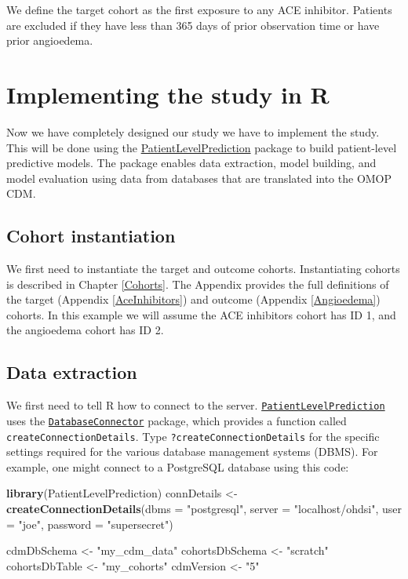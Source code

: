 \documentclass[]{book}
\newenvironment{Shaded}{\begin{snugshade}}{\end{snugshade}}
\newcommand{\KeywordTok}[1]{\textcolor[rgb]{0.13,0.29,0.53}{\textbf{#1}}}
\newcommand{\DataTypeTok}[1]{\textcolor[rgb]{0.13,0.29,0.53}{#1}}
\newcommand{\StringTok}[1]{\textcolor[rgb]{0.31,0.60,0.02}{#1}}
\newcommand{\NormalTok}[1]{#1}
\begin{document}
We define the target cohort as the first exposure to any ACE inhibitor.
Patients are excluded if they have less than 365 days of prior
observation time or have prior angioedema.

\section{Implementing the study in R}\label{implementing-the-study-in-r}

Now we have completely designed our study we have to implement the
study. This will be done using the
\href{https://ohdsi.github.io/PatientLevelPrediction/}{PatientLevelPrediction}
package to build patient-level predictive models. The package enables
data extraction, model building, and model evaluation using data from
databases that are translated into the OMOP CDM.

\subsection{Cohort instantiation}\label{cohort-instantiation-1}

We first need to instantiate the target and outcome cohorts.
Instantiating cohorts is described in Chapter \ref{Cohorts}. The
Appendix provides the full definitions of the target (Appendix
\ref{AceInhibitors}) and outcome (Appendix \ref{Angioedema}) cohorts. In
this example we will assume the ACE inhibitors cohort has ID 1, and the
angioedema cohort has ID 2.

\subsection{Data extraction}\label{data-extraction-1}

We first need to tell R how to connect to the server.
\href{https://ohdsi.github.io/PatientLevelPrediction/}{\texttt{PatientLevelPrediction}}
uses the
\href{https://ohdsi.github.io/DatabaseConnector/}{\texttt{DatabaseConnector}}
package, which provides a function called
\texttt{createConnectionDetails}. Type \texttt{?createConnectionDetails}
for the specific settings required for the various database management
systems (DBMS). For example, one might connect to a PostgreSQL database
using this code:

\begin{Shaded}
\begin{Highlighting}[]
\KeywordTok{library}\NormalTok{(PatientLevelPrediction)}
\NormalTok{connDetails <-}\StringTok{ }\KeywordTok{createConnectionDetails}\NormalTok{(}\DataTypeTok{dbms =} \StringTok{"postgresql"}\NormalTok{,}
                                       \DataTypeTok{server =} \StringTok{"localhost/ohdsi"}\NormalTok{,}
                                       \DataTypeTok{user =} \StringTok{"joe"}\NormalTok{,}
                                       \DataTypeTok{password =} \StringTok{"supersecret"}\NormalTok{)}

\NormalTok{cdmDbSchema <-}\StringTok{ "my_cdm_data"}
\NormalTok{cohortsDbSchema <-}\StringTok{ "scratch"}
\NormalTok{cohortsDbTable <-}\StringTok{ "my_cohorts"}
\NormalTok{cdmVersion <-}\StringTok{ "5"}
\end{Highlighting}
\end{Shaded}
\end{document}
